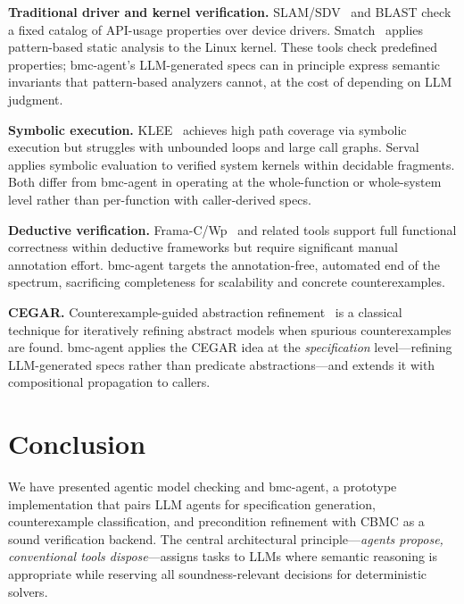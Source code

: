 \documentclass[11pt,a4paper]{article}
\newcommand{\tool}{bmc-agent\xspace}
\begin{document}
\noindent\textbf{Traditional driver and kernel verification.}
SLAM/SDV~\cite{slam,sdv} and BLAST check a fixed catalog of API-usage
properties over device drivers. Smatch~\cite{smatch} applies pattern-based
static analysis to the Linux kernel. These tools check predefined properties;
\tool's LLM-generated specs can in principle express semantic invariants that
pattern-based analyzers cannot, at the cost of depending on LLM judgment.

\noindent\textbf{Symbolic execution.}
KLEE~\cite{klee} achieves high path coverage via symbolic execution but
struggles with unbounded loops and large call graphs. Serval~\cite{serval}
applies symbolic evaluation to verified system kernels within decidable
fragments. Both differ from \tool in operating at the whole-function or
whole-system level rather than per-function with caller-derived specs.

\noindent\textbf{Deductive verification.}
Frama-C/Wp~\cite{framac} and related tools support full functional
correctness within deductive frameworks but require significant manual
annotation effort. \tool targets the annotation-free, automated end of the
spectrum, sacrificing completeness for scalability and concrete
counterexamples.

\noindent\textbf{CEGAR.}
Counterexample-guided abstraction refinement~\cite{cegar} is a classical
technique for iteratively refining abstract models when spurious
counterexamples are found. \tool applies the CEGAR idea at the
\emph{specification} level---refining LLM-generated specs rather than
predicate abstractions---and extends it with compositional propagation to
callers.

\section{Conclusion}
\label{sec:conclusion}

We have presented agentic model checking and \tool, a prototype
implementation that pairs LLM agents for specification generation,
counterexample classification, and precondition refinement with CBMC as a
sound verification backend. The central architectural principle---\emph{agents
propose, conventional tools dispose}---assigns tasks to LLMs where semantic
reasoning is appropriate while reserving all soundness-relevant decisions for
deterministic solvers.
\end{document}
